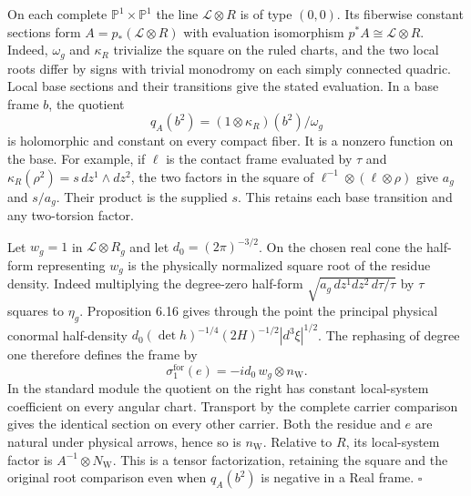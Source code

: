 \documentclass[
  english,
  11pt,
  reqno]{amsart}
\begin{document}
On each complete \(\mathbb P^1\times\mathbb P^1\) the line
\(\mathcal L\otimes R\) is of type \((0,0)\). Its fiberwise constant
sections form \(A=p_*(\mathcal L\otimes R)\) with evaluation isomorphism
\(p^*A\cong\mathcal L\otimes R\). Indeed, \(\omega_g\) and \(\kappa_R\)
trivialize the square on the ruled charts, and the two local roots
differ by signs with trivial monodromy on each simply connected quadric.
Local base sections and their transitions give the stated evaluation. In
a base frame \(b\), the quotient \[
q_A(b^2)=(1\otimes\kappa_R)(b^2)/\omega_g
\] is holomorphic and constant on every compact fiber. It is a nonzero
function on the base. For example, if \(\ell\) is the contact frame
evaluated by \(\tau\) and \(\kappa_R(\rho^2)=s\,dz^1\wedge dz^2\), the
two factors in the square of \(\ell^{-1}\otimes(\ell\otimes\rho)\) give
\(a_g\) and \(s/a_g\). Their product is the supplied \(s\). This retains
each base transition and any two-torsion factor.

Let \(w_g=1\) in \(\mathcal L\otimes R_g\) and let
\(d_0=(2\pi)^{-3/2}\). On the chosen real cone the half-form
representing \(w_g\) is the physically normalized square root of the
residue density. Indeed multiplying the degree-zero half-form
\(\sqrt{a_g\,dz^1dz^2\,d\tau/\tau}\) by \(\tau\) squares to \(\eta_g\).
Proposition 6.16 gives through the point the principal physical conormal
half-density \(d_0(\det h)^{-1/4}(2H)^{-1/2}|d^3\xi|^{1/2}\). The
rephasing of degree one therefore defines the frame by%
 \[
\sigma^{\mathrm{for}}_1(e)=-i d_0\,w_g\otimes n_{\mathrm W}.
\] In the standard module the quotient on the right has constant
local-system coefficient on every angular chart. Transport by the
complete carrier comparison gives the identical section on every other
carrier. Both the residue and \(e\) are natural under physical arrows,
hence so is \(n_{\mathrm W}\). Relative to \(R\), its local-system
factor is \(A^{-1}\otimes N_{\mathrm W}\). This is a tensor
factorization, retaining the square and the original root comparison
even when \(q_A(b^2)\) is negative in a Real frame. \hfill\(\square\)
\end{document}
